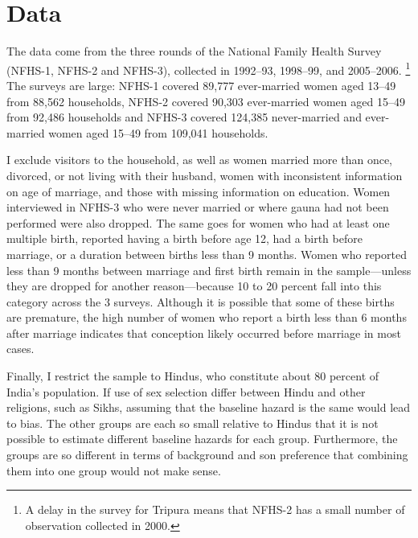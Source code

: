 \documentclass[12pt,letterpaper]{article}
\begin{document}
\section{Data\label{sec:data}}

The data come from the three rounds of the National Family Health Survey 
(NFHS-1, NFHS-2 and NFHS-3),
collected in 1992--93, 1998--99, and 2005--2006.%
\footnote{
A delay in the survey for Tripura means that NFHS-2 has a small number of observation 
collected in 2000.
}
The surveys are large: NFHS-1 covered 89,777 ever-married women 
aged 13--49 from 88,562 households,
NFHS-2 covered 90,303 ever-married women aged 15--49 from 92,486 households
and NFHS-3 covered 124,385 never-married and ever-married women aged 
15--49 from 109,041 households.

I exclude visitors to the household, as well as
women married more than once, divorced, or not living with their husband,
women with inconsistent information on age of marriage,
and those with missing information on education.
Women interviewed in NFHS-3 who were never married or where gauna had not
been performed were also dropped.
The same goes for women who had at least one multiple birth,
reported having a birth before age 12, had a birth before marriage, or
a duration between births less than 9 months.
Women who reported less than 9 months between marriage and first birth
remain in the sample---unless they are dropped for another reason---because 
10 to 20 percent fall into this category across the 3 surveys.
Although it is possible that some of these births are premature, the high number of
women who report a birth less than 6 months after marriage indicates that conception
likely occurred before marriage in most cases.

Finally, I restrict the sample to Hindus,
who constitute about 80 percent of India's population.
If use of sex selection differ between Hindu and other religions, such 
as Sikhs, assuming that the baseline hazard is the same would lead to bias.
The other groups are each so small relative to Hindus that it is not
possible to estimate different baseline hazards for each group.
Furthermore, the groups are so different in terms of background and son preference
that combining them into one group would not make sense.
\end{document}
